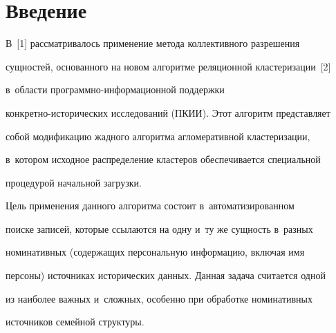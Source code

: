 









 \thispagestyle{headings}


 


 \vspace*{-22pt}





\section{Введение}





\vspace*{-4pt}








  В~[1] рассматривалось применение метода коллективного разрешения 


сущностей, основанного на новом алгоритме реляционной кластеризации~[2] 


в~об\-ласти про\-грам\-мно-ин\-фор\-ма\-ци\-он\-ной поддержки  


кон\-крет\-но-ис\-то\-ри\-че\-ских исследований (ПКИИ). Этот алгоритм представляет 


собой модификацию жад\-но\-го алгоритма агломеративной кластеризации, 


в~котором исходное распределение кластеров обеспечивается специальной 


процедурой начальной за\-грузки.


  


  Цель применения данного алгоритма со\-сто\-ит в~автоматизированном 


поиске записей, которые ссылаются на одну и~ту же сущ\-ность в~разных 


номинативных (содержащих персональную информацию, включая имя 


персоны) источниках исторических данных. Данная задача считается одной 


из наиболее важных и~слож\-ных, особенно при обработке номинативных 


источников семейной структуры. 



